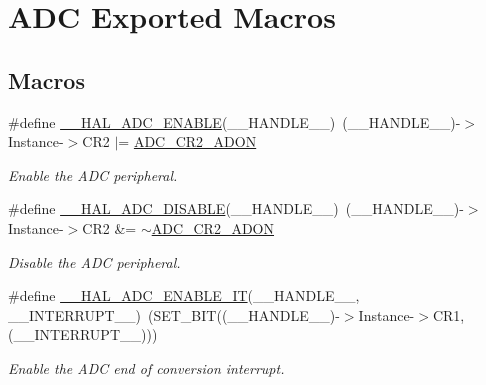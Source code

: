 \hypertarget{group___a_d_c___exported___macros}{\section{A\-D\-C Exported Macros}
\label{group___a_d_c___exported___macros}
}
\subsection*{Macros}
\begin{DoxyCompactItemize}
\item 
\#define \hyperlink{group___a_d_c___exported___macros_gaadf16862da7593def189559423c287f4}{\-\_\-\-\_\-\-H\-A\-L\-\_\-\-A\-D\-C\-\_\-\-E\-N\-A\-B\-L\-E}(\-\_\-\-\_\-\-H\-A\-N\-D\-L\-E\-\_\-\-\_\-)~(\-\_\-\-\_\-\-H\-A\-N\-D\-L\-E\-\_\-\-\_\-)-\/$>$Instance-\/$>$C\-R2 $\vert$= \hyperlink{group___peripheral___registers___bits___definition_ga89b646f092b052d8488d2016f6290f0e}{A\-D\-C\-\_\-\-C\-R2\-\_\-\-A\-D\-O\-N}
\begin{DoxyCompactList}\small\item\em Enable the A\-D\-C peripheral. \end{DoxyCompactList}\item 
\#define \hyperlink{group___a_d_c___exported___macros_ga8afd5963c41c0a30c5cf1fec5c5710b3}{\-\_\-\-\_\-\-H\-A\-L\-\_\-\-A\-D\-C\-\_\-\-D\-I\-S\-A\-B\-L\-E}(\-\_\-\-\_\-\-H\-A\-N\-D\-L\-E\-\_\-\-\_\-)~(\-\_\-\-\_\-\-H\-A\-N\-D\-L\-E\-\_\-\-\_\-)-\/$>$Instance-\/$>$C\-R2 \&= $\sim$\hyperlink{group___peripheral___registers___bits___definition_ga89b646f092b052d8488d2016f6290f0e}{A\-D\-C\-\_\-\-C\-R2\-\_\-\-A\-D\-O\-N}
\begin{DoxyCompactList}\small\item\em Disable the A\-D\-C peripheral. \end{DoxyCompactList}\item 
\#define \hyperlink{group___a_d_c___exported___macros_ga650073de508d335d0a1c7bf9b4d07afe}{\-\_\-\-\_\-\-H\-A\-L\-\_\-\-A\-D\-C\-\_\-\-E\-N\-A\-B\-L\-E\-\_\-\-I\-T}(\-\_\-\-\_\-\-H\-A\-N\-D\-L\-E\-\_\-\-\_\-, \-\_\-\-\_\-\-I\-N\-T\-E\-R\-R\-U\-P\-T\-\_\-\-\_\-)~(S\-E\-T\-\_\-\-B\-I\-T((\-\_\-\-\_\-\-H\-A\-N\-D\-L\-E\-\_\-\-\_\-)-\/$>$Instance-\/$>$C\-R1, (\-\_\-\-\_\-\-I\-N\-T\-E\-R\-R\-U\-P\-T\-\_\-\-\_\-)))
\begin{DoxyCompactList}\small\item\em Enable the A\-D\-C end of conversion interrupt. \end{DoxyCompactList}\item 

\end{DoxyCompactItemize}
